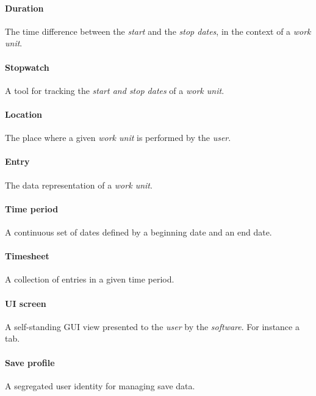 \paragraph{Duration} The time difference between the \emph{start} and the
  \emph{stop dates}, in the context of a \emph{work unit}.
\paragraph{Stopwatch} A tool for tracking the \emph{start and stop dates} of
  a \emph{work unit}.
\paragraph{Location} The place where a given \emph{work unit} is performed
  by the \emph{user}.
\paragraph{Entry} The data representation of a \emph{work unit}.
\paragraph{Time period} A continuous set of dates defined by a beginning
  date and an end date.
\paragraph{Timesheet} A collection of entries in a given time period.
\paragraph{\gls{UI} screen} A self-standing \gls{GUI} view presented to the
\emph{user} by the \emph{software}. For instance a tab.
\paragraph{Save profile} A segregated user identity for managing save data.